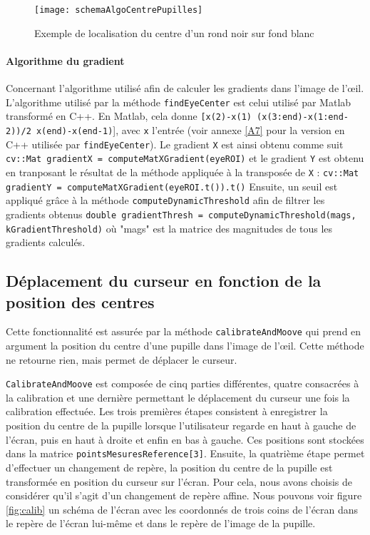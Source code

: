 \begin{figure}[H]
  \centering
  \texttt{[image: schemaAlgoCentrePupilles]}
  \caption{Exemple de localisation du centre d'un rond noir sur fond blanc \cite{timm2011accurate}}
  \label{fig:schemaAlgoCentrePupilles}
\end{figure}

\paragraph{Algorithme du gradient}

Concernant l’algorithme utilisé afin de calculer les gradients dans l’image de l’œil. L’algorithme utilisé par la méthode \lstinline=findEyeCenter= est celui utilisé par Matlab transformé en C++. En Matlab, cela donne \lstinline=[x(2)-x(1) (x(3:end)-x(1:end-2))/2 x(end)-x(end-1)=], avec \lstinline=x= l’entrée (voir annexe \ref{A7} pour la version en C++ utilisée par \lstinline=findEyeCenter=). Le gradient \lstinline=X= est ainsi obtenu comme suit \lstinline-cv::Mat gradientX = computeMatXGradient(eyeROI)- et le gradient \lstinline=Y= est obtenu en tranposant le résultat de la méthode appliquée à la transposée de \lstinline=X= : \lstinline-cv::Mat gradientY = computeMatXGradient(eyeROI.t()).t()-
Ensuite, un seuil est appliqué grâce à la méthode \lstinline=computeDynamicThreshold= afin de filtrer les gradients obtenus \lstinline-double gradientThresh = computeDynamicThreshold(mags, kGradientThreshold)- où "mags" est la matrice des magnitudes de tous les gradients calculés.

\subsection{Déplacement du curseur en fonction de la position des centres}

Cette fonctionnalité est assurée par la méthode \lstinline=calibrateAndMoove=  qui prend en argument la position du centre d’une pupille dans l’image de l’œil. Cette méthode ne retourne rien, mais permet de déplacer le curseur.

\lstinline=CalibrateAndMoove= est composée de cinq parties différentes, quatre consacrées à la calibration et une dernière permettant le déplacement du curseur une fois la calibration effectuée. Les trois premières étapes consistent à enregistrer la position du centre de la pupille lorsque l’utilisateur regarde en haut à gauche de l’écran, puis en haut à droite et enfin en bas à gauche. Ces positions sont stockées dans la matrice \lstinline=pointsMesuresReference[3]=. Ensuite, la quatrième étape permet d’effectuer un changement de repère, la position du centre de la pupille est transformée en position du curseur sur l’écran. Pour cela, nous avons choisis de considérer qu’il s’agit d’un changement de repère affine. Nous pouvons voir figure \ref{fig:calib} un schéma de l’écran avec les coordonnés de trois coins de l’écran dans le repère de l’écran lui-même et dans le repère de l’image de la pupille.

